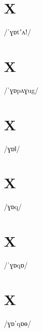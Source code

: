 \documentclass[10pt,a4paper,twoside]{book}
\begin{document}
\section*{X}

\begin{multicols}{3}
 {/ˈɣɒtʼʌǃ/} {}
\end{multicols}

\section*{X}

\begin{multicols}{3}
 {/ˈɣɒpʌɣug/} {}
\end{multicols}

\section*{X}

\begin{multicols}{3}
 {/ɣɒǁ/} {}
\end{multicols}

\section*{X}

\begin{multicols}{3}
 {/ɣɒq/} {}
\end{multicols}

\section*{X}

\begin{multicols}{3}
 {/ˈɣɒqɒ/} {}
\end{multicols}

\section*{X}

\begin{multicols}{3}
 {/ɣɒˈqɒɵ/} {}
\end{multicols}
\end{document}
